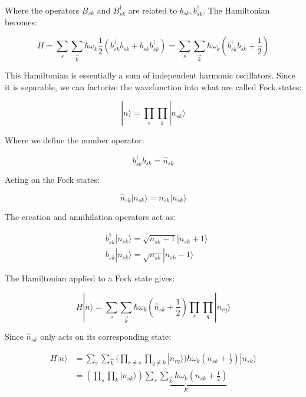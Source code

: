 Where the operators $B_{sk}$ and $B_{sk}^\dagger$ are related to $b_{sk}, b_{sk}^\dagger$. The Hamiltonian becomes:

\begin{equation}
H=\sum_s\sum_{\vec{k}}\hbar\omega_k\frac{1}{2}(b_{sk}^\dagger b_{sk}+b_{sk}b_{sk}^\dagger)=\sum_s\sum_{\vec{k}}\hbar\omega_k(b_{sk}^\dagger b_{sk}+\frac{1}{2})
\end{equation}


This Hamiltonian is essentially a sum of independent harmonic oscillators. Since it is separable, we can factorize the wavefunction into what are called Fock states:

\begin{equation}
|n\rangle=\prod_s\prod_k|n_{sk}\rangle
\end{equation}

Where we define the number operator:

\begin{equation}
b_{sk}^\dagger b_{sk}=\hat{n}_{sk}
\end{equation}

Acting on the Fock states:

\begin{equation}
\hat{n}_{sk}|n_{sk}\rangle=n_{sk}|n_{sk}\rangle
\end{equation}

The creation and annihilation operators act as:

\begin{align}
&b_{sk}^\dagger|n_{sk}\rangle=\sqrt{n_{sk}+1}|n_{sk}+1\rangle \\
&b_{sk}|n_{sk}\rangle=\sqrt{n_{sk}}|n_{sk}-1\rangle
\end{align}

The Hamiltonian applied to a Fock state gives:

\begin{equation}
H|n\rangle=\sum_s\sum_{\vec{k}}\hbar\omega_k(\hat{n}_{sk}+\frac{1}{2})\prod_r\prod_q|n_{rq}\rangle
\end{equation}

Since $\hat{n}_{sk}$ only acts on its corresponding state:

\begin{align}
H|n\rangle&=\sum_s\sum_{\vec{k}}(\prod_{r\neq s}\prod_{q\neq k}|n_{rq}\rangle)\hbar\omega_k(n_{sk}+\frac{1}{2})|n_{sk}\rangle\\
&=(\prod_s\prod_k|n_{sk}\rangle)\underbrace{\sum_s\sum_{\vec{k}}\hbar\omega_k(n_{sk}+\frac{1}{2})}_E
\end{align}

